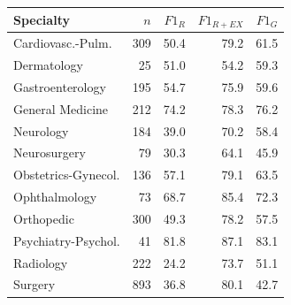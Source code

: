 \begin{tabular}{@{}lrrrr@{}}
\toprule
Specialty & $n$ & $F1_R$ & $F1_{R+EX}$ & $F1_G$ \\
\midrule
Cardiovasc.-Pulm. & 309 & 50.4 & 79.2 & 61.5 \\
Dermatology & 25 & 51.0 & 54.2 & 59.3 \\
Gastroenterology & 195 & 54.7 & 75.9 & 59.6 \\
General Medicine & 212 & 74.2 & 78.3 & 76.2 \\
Neurology & 184 & 39.0 & 70.2 & 58.4 \\
Neurosurgery & 79 & 30.3 & 64.1 & 45.9 \\
Obstetrics-Gynecol. & 136 & 57.1 & 79.1 & 63.5 \\
Ophthalmology & 73 & 68.7 & 85.4 & 72.3 \\
Orthopedic & 300 & 49.3 & 78.2 & 57.5 \\
Psychiatry-Psychol. & 41 & 81.8 & 87.1 & 83.1 \\
Radiology & 222 & 24.2 & 73.7 & 51.1 \\
Surgery & 893 & 36.8 & 80.1 & 42.7 \\
\bottomrule
\end{tabular}
